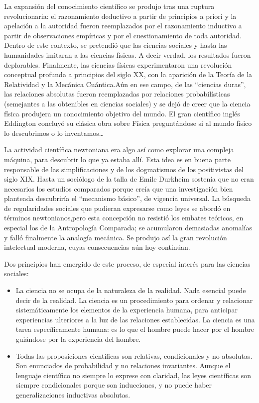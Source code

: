 \documentclass[
]{book}
\begin{document}
La expansión del conocimiento científico se produjo tras una ruptura revolucionaria: el razonamiento deductivo a partir de principios a priori y la apelación a la autoridad fueron reemplazados por el razonamiento inductivo a partir de observaciones empíricas y por el cuestionamiento de toda autoridad. Dentro de este contexto, se pretendió que las ciencias sociales y hasta las humanidades imitaran a las ciencias físicas. A decir verdad, los resultados fueron deplorables. Finalmente, las ciencias físicas experimentaron una revolución conceptual profunda a principios del siglo XX, con la aparición de la Teoría de la Relatividad y la Mecánica Cuántica.Aún en ese campo, de las ``ciencias duras'', las relaciones absolutas fueron reemplazadas por relaciones probabilísticas (semejantes a las obtenibles en ciencias sociales) y se dejó de creer que la ciencia física produjera un conocimiento objetivo del mundo. El gran científico inglés Eddington concluyó su clásica obra sobre Física preguntándose si al mundo físico lo descubrimos o lo inventamos\ldots{}

La actividad científica newtoniana era algo así como explorar una compleja máquina, para descubrir lo que ya estaba allí. Esta idea es en buena parte responsable de las simplificaciones y de los dogmatismos de los positivistas del siglo XIX. Hasta un sociólogo de la talla de Emile Durkheim sostenía que no eran necesarios los estudios comparados porque creía que una investigación bien planteada descubriría el ``mecanismo básico'', de vigencia universal. La búsqueda de regularidades sociales que pudieran expresarse como leyes se abordó en términos newtonianos,pero esta concepción no resistió los embates teóricos, en especial los de la Antropología Comparada; se acumularon demasiadas anomalías y falló finalmente la analogía mecánica. Se produjo así la gran revolución intelectual moderna, cuyas consecuencias aún hoy continúan.

Dos principios han emergido de este proceso, de especial interés para las ciencias sociales:

\begin{itemize}
\item
  La ciencia no se ocupa de la naturaleza de la realidad. Nada esencial puede decir de la realidad. La ciencia es un procedimiento para ordenar y relacionar sistemáticamente los elementos de la experiencia humana, para anticipar experiencias ulteriores a la luz de las relaciones establecidas. La ciencia es una tarea específicamente humana: es lo que el hombre puede hacer por el hombre guiándose por la experiencia del hombre.
\item
  Todas las proposiciones científicas son relativas, condicionales y no absolutas. Son enunciados de probabilidad y no relaciones invariantes. Aunque el lenguaje científico no siempre lo exprese con claridad, las leyes científicas son siempre condicionales porque son inducciones, y no puede haber generalizaciones inductivas absolutas.
\end{itemize}
\end{document}
